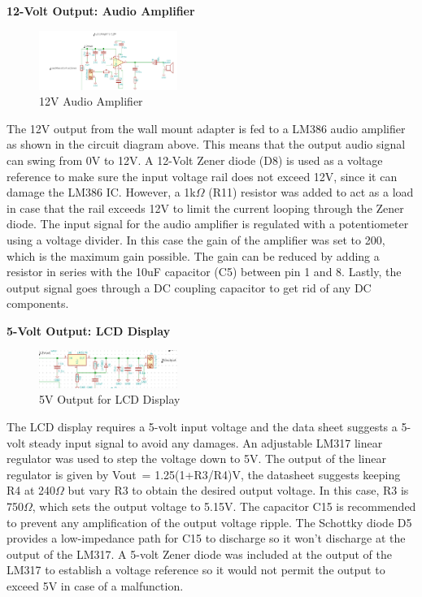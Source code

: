 \documentclass[journal,compsoc]{IEEEtran}
\begin{document}
\textbf {12-Volt Output: Audio Amplifier }

\begin{figure}[ht]	%
\centering
\includegraphics[width=0.4\textwidth]{Audio.png}
\caption{ 12V Audio Amplifier}
\label{Paudio}
\end{figure}

The 12V output from the wall mount adapter is fed to a LM386 audio amplifier as shown in the circuit diagram above. This means that the output audio signal can swing from 0V to 12V. A 12-Volt Zener diode (D8) is used as a voltage reference to make sure the input voltage rail does not exceed 12V, since it can damage the LM386 IC. However, a 1k$\Omega$ (R11) resistor was added to act as a load in case that the rail exceeds 12V to limit the current looping through the Zener diode. The input signal for the audio amplifier is regulated with a potentiometer using a voltage divider. In this case the gain of the amplifier was set to 200, which is the maximum gain possible. The gain can be reduced by adding a resistor in series with the 10uF capacitor (C5) between pin 1 and 8. Lastly, the output signal goes through a DC coupling capacitor to get rid of any DC components. 


\textbf {5-Volt Output: LCD Display}

\begin{figure}[ht]	%
\centering
\includegraphics[width=0.4\textwidth]{Linear.png}
\caption{ 5V Output for LCD Display }
\label{Pdisplay}
\end{figure}

The LCD display requires a 5-volt input voltage and the data sheet suggests a 5-volt steady input signal to avoid any damages.  An adjustable LM317 linear regulator was used to step the voltage down to 5V.  The output of the linear regulator is given by Vout~= 1.25(1+R3/R4)V, the datasheet suggests keeping R4 at 240$\Omega$ but vary R3 to obtain the desired output voltage.  In this case, R3 is 750$\Omega$, which sets the output voltage to 5.15V.  The capacitor C15 is recommended to prevent any amplification of the output voltage ripple.  The Schottky diode D5 provides a low-impedance path for C15 to discharge so it won’t discharge at the output of the LM317.  A 5-volt Zener diode was included at the output of the LM317 to establish a voltage reference so it would not permit the output to exceed 5V in case of a malfunction.
\end{document}
